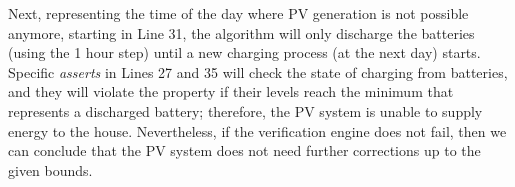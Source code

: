\documentclass[journal]{IEEEtran}
\begin{document}
Next, representing the time of the day where PV generation is not possible anymore, starting in Line 31, the algorithm will only discharge the batteries (using the 1 hour step) until a new charging process (at the next day) starts. Specific \textit{asserts} in Lines 27 and 35 will check the state of charging from batteries, and they will violate the property if their levels reach the minimum that represents a discharged battery; therefore, the PV system is unable to supply energy to the house. Nevertheless, if the verification engine does not fail, then we can conclude that the PV system does not need further corrections up to the given bounds.
%
\end{document}
